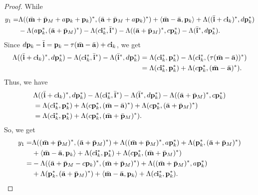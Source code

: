 \documentclass[reqno,12pt]{amsart}
\numberwithin{equation}{section}
\def\lr#1{\langle #1\rangle} \def\fin{\hfill$\square$}  \def\lra{\longrightarrow} \def\mod{\mbox{\rm \textbf{mod}}\,}\def\Mod{\mbox{\rm mod}\,}\def\top{\mbox{\rm top}\,}\def\soc{\mbox{\rm soc}\,}
\theoremstyle{plain} %
\theoremstyle{definition} %
\begin{document}
\begin{proof}
While
\begin{align*}
y_1=&\Lambda((\bar{{\bf m}}+\bar{{\bf p}}_M+a{\bf p}_k+{\bf p}_k)^\ast,(\bar{{\bf a}}+\bar{{\bf p}}_M+a{\bf p}_k)^\ast)+\lr{\bar{{\bf m}}-\bar{{\bf a}},{\bf p}_k}+\Lambda((\bar{{\bf i}}+c{\bf i}_k)^\ast,d{\bf p}_k^\ast)\\
&-\Lambda(a{\bf p}_k^\ast,(\bar{{\bf a}}+\bar{{\bf p}}_M)^\ast)-\Lambda(c{\bf i}_k^\ast,{\bar{{\bf i}}}^\ast)-\Lambda((\bar{{\bf a}}+\bar{{\bf p}}_M)^\ast,c{\bf p}_k^\ast)-\Lambda({\bar{{\bf i}}}^\ast,d{\bf p}_k^\ast).
\end{align*}
Since $d{\bf p}_k-\bar{{\bf i}}={\bf p}_k-\tau(\bar{{\bf m}}-\bar{{\bf a}})+c{\bf i}_k$, we get
\begin{align*}
\Lambda((\bar{{\bf i}}+c{\bf i}_k)^\ast,d{\bf p}_k^\ast)-\Lambda(c{\bf i}_k^\ast,{\bar{{\bf i}}}^\ast)-\Lambda({\bar{{\bf i}}}^\ast,d{\bf p}_k^\ast)
&=\Lambda(c{\bf i}_k^\ast,{\bf p}_k^\ast)-\Lambda(c{\bf i}_k^\ast,(\tau(\bar{{\bf m}}-\bar{{\bf a}}))^\ast)\\
&=\Lambda(c{\bf i}_k^\ast,{\bf p}_k^\ast)+\Lambda(c{\bf p}_k^\ast,(\bar{{\bf m}}-\bar{{\bf a}})^\ast).
\end{align*}
Thus, we have
\begin{align*}
&\Lambda((\bar{{\bf i}}+c{\bf i}_k)^\ast,d{\bf p}_k^\ast)-\Lambda(c{\bf i}_k^\ast,{\bar{{\bf i}}}^\ast)-\Lambda({\bar{{\bf i}}}^\ast,d{\bf p}_k^\ast)-\Lambda((\bar{{\bf a}}+\bar{{\bf p}}_M)^\ast,c{\bf p}_k^\ast)\\
&=\Lambda(c{\bf i}_k^\ast,{\bf p}_k^\ast)+\Lambda(c{\bf p}_k^\ast,(\bar{{\bf m}}-\bar{{\bf a}})^\ast)+\Lambda(c{\bf p}_k^\ast,(\bar{{\bf a}}+\bar{{\bf p}}_M)^\ast)\\
&=\Lambda(c{\bf i}_k^\ast,{\bf p}_k^\ast)+\Lambda(c{\bf p}_k^\ast,(\bar{{\bf m}}+\bar{{\bf p}}_M)^\ast).
\end{align*}
So, we get
\begin{align*}
y_1=&\Lambda((\bar{{\bf m}}+\bar{{\bf p}}_M)^\ast,(\bar{{\bf a}}+\bar{{\bf p}}_M)^\ast)+\Lambda((\bar{{\bf m}}+\bar{{\bf p}}_M)^\ast,a{\bf p}_k^\ast)
+\Lambda({\bf p}_k^\ast,(\bar{{\bf a}}+\bar{{\bf p}}_M)^\ast)\\&+\lr{\bar{{\bf m}}-\bar{{\bf a}},{\bf p}_k}+\Lambda(c{\bf i}_k^\ast,{\bf p}_k^\ast)+\Lambda(c{\bf p}_k^\ast,(\bar{{\bf m}}+\bar{{\bf p}}_M)^\ast)\\
=&-\Lambda((\bar{{\bf a}}+\bar{{\bf p}}_M-c{\bf p}_k)^\ast,(\bar{{\bf m}}+\bar{{\bf p}}_M)^\ast)+\Lambda((\bar{{\bf m}}+\bar{{\bf p}}_M)^\ast,a{\bf p}_k^\ast)
\\&+\Lambda({\bf p}_k^\ast,(\bar{{\bf a}}+\bar{{\bf p}}_M)^\ast)+\lr{\bar{{\bf m}}-\bar{{\bf a}},{\bf p}_k}+\Lambda(c{\bf i}_k^\ast,{\bf p}_k^\ast).

\end{align*}
\end{proof}
\end{document}
